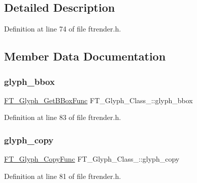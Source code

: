 \subsection{Detailed Description}


Definition at line 74 of file ftrender.\+h.



\subsection{Member Data Documentation}
\mbox{\label{struct_f_t___glyph___class___a06bfad431865c6731305cb781f78b317}} 
\subsubsection{\texorpdfstring{glyph\_bbox}{glyph\_bbox}}
{\footnotesize\ttfamily \mbox{\hyperlink{ftrender_8h_aba35e5441765cabf71e6ccdc248dac5c}{F\+T\+\_\+\+Glyph\+\_\+\+Get\+B\+Box\+Func}} F\+T\+\_\+\+Glyph\+\_\+\+Class\+\_\+\+::glyph\+\_\+bbox}



Definition at line 83 of file ftrender.\+h.

\mbox{\label{struct_f_t___glyph___class___afc78dcdc4802760ebcaccf3a7b6cd088}} 
\subsubsection{\texorpdfstring{glyph\_copy}{glyph\_copy}}
{\footnotesize\ttfamily \mbox{\hyperlink{ftrender_8h_a6d431bb14581040ff97ab1f695ac5f6b}{F\+T\+\_\+\+Glyph\+\_\+\+Copy\+Func}} F\+T\+\_\+\+Glyph\+\_\+\+Class\+\_\+\+::glyph\+\_\+copy}



Definition at line 81 of file ftrender.\+h.

\mbox{\label{struct_f_t___glyph___class___aabf05a4368dccacf45e1a54e542e5d63}} 
